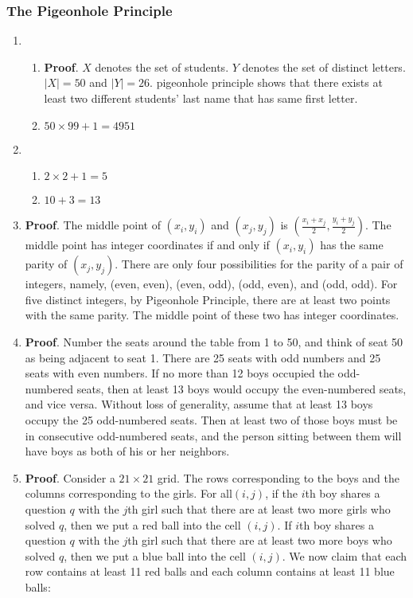 \documentclass{../../cls/sig-alternate-05-2015}
\begin{document}
\subsubsection{The Pigeonhole Principle}
\begin{enumerate}
    \item\begin{enumerate}
        \item \textbf{Proof}. $X$ denotes the set of students. $Y$ denotes the set of distinct letters.
        $|X|=50$ and $|Y|=26$. pigeonhole principle shows that there exists at least two different students' last name that has same first letter.
        
        \item $50 \times 99 + 1=4951$
    \end{enumerate}
    
    \item \begin{enumerate}
        \item $2\times 2+1=5$
        
        \item $10+3=13$
    \end{enumerate}
    \item \textbf{Proof}. The middle point of $(x_i, y_i)$ and $(x_j, y_j)$ is $(\frac{x_i + x_j}{2}, \frac{y_i + y_j}{2})$. The middle point has integer coordinates if and only if $(x_i, y_i)$ has the same parity of $(x_j, y_j)$.  There are only
    four possibilities for the parity of a pair of integers, namely, (even, even), (even, odd),
    (odd, even), and (odd, odd). For five distinct integers, by Pigeonhole Principle, there
    are at least two points with the same parity. The middle point of these two has integer
    coordinates.
    
    \item \textbf{Proof}. Number the seats around the table
    from 1 to 50, and think of seat 50 as being adjacent to seat 1.
    There are 25 seats with odd numbers and 25 seats with even
    numbers. If no more than 12 boys occupied the odd-numbered seats, then at least 13 boys would occupy the even-numbered
    seats, and vice versa. Without loss of generality, assume that
    at least 13 boys occupy the 25 odd-numbered seats. Then at
    least two of those boys must be in consecutive odd-numbered
    seats, and the person sitting between them will have boys as
    both of his or her neighbors.
    
    \item \textbf{Proof}. Consider a $21 \times 21$ grid. The rows corresponding to the boys and the columns corresponding to the girls. For all$(i, j)$, if the    $i$th boy shares a question $q$ with the $j$th girl    such that there are at least two more girls who solved $q$, then we put a red ball into the    cell $(i, j)$. If $i$th boy shares a question $q$ with the $j$th girl such that there are at least two more boys who solved    $q$, then we put a blue ball into the cell $(i, j)$.  We now claim that each row contains at least 11 red balls and each column contains at least 11 blue balls:


\end{enumerate}
\end{document}
